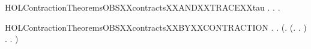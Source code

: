 \newcommand{\HOLContractionTheoremsOBSXXcontractsXXANDXXTRACEXXlabel}{\UseVerbatim{HOLContractionTheoremsOBSXXcontractsXXANDXXTRACEXXlabel}}
\begin{SaveVerbatim}{HOLContractionTheoremsOBSXXcontractsXXANDXXTRACEXXtau}
\HOLTokenTurnstile{} \HOLSymConst{\HOLTokenForall{}} .
          \HOLSymConst{\HOLTokenImp{}}
       \HOLSymConst{\HOLTokenForall{}}  .
               \HOLSymConst{\HOLTokenConj{}}   \HOLSymConst{\HOLTokenImp{}}
           \HOLSymConst{\HOLTokenExists{}} .
                   \HOLSymConst{\HOLTokenConj{}}    \HOLSymConst{\HOLTokenConj{}}
                 \HOLSymConst{\HOLTokenLeq{}}   \HOLSymConst{\HOLTokenConj{}}  
\end{SaveVerbatim}
\newcommand{\HOLContractionTheoremsOBSXXcontractsXXANDXXTRACEXXtau}{\UseVerbatim{HOLContractionTheoremsOBSXXcontractsXXANDXXTRACEXXtau}}
\begin{SaveVerbatim}{HOLContractionTheoremsOBSXXcontractsXXBYXXCONTRACTION}
\HOLTokenTurnstile{} \HOLSymConst{\HOLTokenForall{}}.
         \HOLSymConst{\HOLTokenImp{}}
       \HOLSymConst{\HOLTokenForall{}} .
           (\HOLSymConst{\HOLTokenForall{}}.
                (\HOLSymConst{\HOLTokenForall{}}.  \HOLTokenTransBegin{}\HOLTokenTransEnd {} \HOLSymConst{\HOLTokenImp{}} \HOLSymConst{\HOLTokenExists{}}.  \HOLTokenTransBegin{}\HOLTokenTransEnd {} \HOLSymConst{\HOLTokenConj{}}   ) \HOLSymConst{\HOLTokenConj{}}
                \HOLSymConst{\HOLTokenForall{}}.  \HOLTokenTransBegin{}\HOLTokenTransEnd {} \HOLSymConst{\HOLTokenImp{}} \HOLSymConst{\HOLTokenExists{}}.  \HOLTokenWeakTransBegin{}\HOLTokenWeakTransEnd {} \HOLSymConst{\HOLTokenConj{}}   ) \HOLSymConst{\HOLTokenImp{}}
             
\end{SaveVerbatim}
